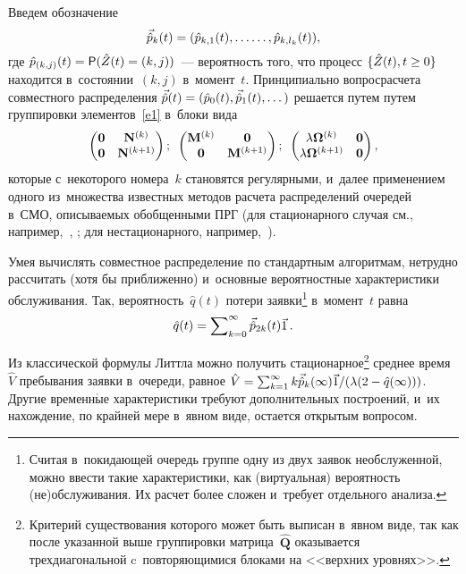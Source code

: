 \begin{multicols}{2}
Введем обозначение 
$$
\vec{\hat {p}}_k(t)\hm=({\hat p}_{k,1}(t),\ldots\linebreak \ldots,{\hat p}_{k,l_k}(t)),
$$
 где ${\hat p}_{(k,j)}(t)\hm=\mathsf{P} 
(\hat{Z}(t)\hm=(k,j))$~--- вероятность того, что процесс $\{\hat{Z}(t), t \hm\ge 0\}$ находится в~состоянии~$(k,j)$ в~момент~$t$.
Принципиально вопрос\linebreak расчета совместного распределения $\vec{\hat {p}}(t)\hm=({\hat { p}}_0(t),\vec{\hat { p}}_1(t),\dots)$
решается путем путем группировки элементов~\eqref{e1} в~блоки вида
$$
\begin{pmatrix} \mathbf{0} &  \mathbf{N}^{(k)} \\ \mathbf{0}& \mathbf{N}^{(k+1)} 
\end{pmatrix};\enskip 
\begin{pmatrix} \mathbf{M}^{(k)} & \mathbf{0} \\ \mathbf{0}& \mathbf{M}^{(k+1)} 
\end{pmatrix}; \enskip
\begin{pmatrix} 
\lambda \bm{\Omega}^{(k)} & \mathbf{0} \\  \lambda \bm{\Omega}^{(k+1)} & \mathbf{0}
\end{pmatrix},
$$
которые с~некоторого номера~$k$ становятся регулярными,
и~далее применением одного из~множества известных методов расчета распределений 
очередей в~СМО,
описываемых обобщенными ПРГ (для стационарного случая см., например,~\cite[теорема~2]{nn2}, \cite[с.~242]{ppav}; 
для нестационарного, например,~\cite{nn0,nn0rrr}).

Умея вычислять совместное распределение по стандартным алгоритмам, нетрудно
рассчитать (хотя бы приближенно) и~основные вероятностные характеристики 
обслуживания. Так, вероятность~${\hat {q}}(t)$ потери заявки\footnote[2]{Считая в~покидающей очередь
группе одну из двух заявок необслуженной, можно ввести такие характеристики, как (виртуальная) вероятность 
(не)обслуживания. Их расчет более сложен и~требует отдельного анализа.} в~момент~$t$
равна 
$$
{\hat { q}}(t)\hm={\sum\nolimits_{k=0}^{\infty} \vec{\hat { p}}_{2k}(t){\vec { 1}}}\,.
$$

\vspace*{-12pt}

\columnbreak

\noindent
Из классической формулы Литтла можно получить стационарное\footnote[3]{Критерий 
существования которого может быть выписан в~явном виде, так как после указанной выше 
группировки матрица~$\hat{\mathbf{Q}}$ оказывается трехдиагональной c~повторяющимися блоками на <<верхних  уровнях>>.}
среднее  время~${\hat V}$ пребывания заявки в~очереди, равное
${\hat V}\hm=\sum\nolimits_{k=1}^{\infty} k \vec{\hat { p}}_{k}(\infty){\vec { 1}}/(\lambda 
(2-{\hat { q}}(\infty)))$.
 Другие временн$\acute{\mbox{ы}}$е характеристики требуют 
дополнительных построений, и~их нахождение, по крайней мере в~явном виде, 
остается открытым вопросом.



\end{multicols}
